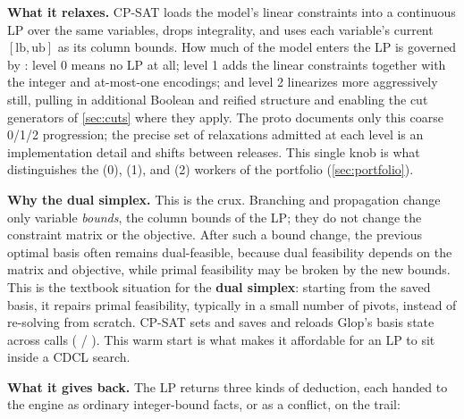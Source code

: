 \textbf{What it relaxes.} CP-SAT loads the model's linear constraints into a
continuous LP over the same variables, drops integrality, and uses each
variable's current $[\text{lb}, \text{ub}]$ as its column bounds. How much of the
model enters the LP is governed by : level 0 means no
LP at all; level 1 adds the linear constraints together with the integer and
at-most-one encodings; and level 2 linearizes more aggressively still, pulling in
additional Boolean and reified structure and enabling the cut generators of
\cref{sec:cuts} where they apply. The proto documents only this coarse
0/1/2 progression; the precise set of relaxations admitted at each level is an
implementation detail and shifts between releases. This single knob is what
distinguishes the  (0),  (1), and 
(2) workers of the portfolio (\cref{sec:portfolio}).

\textbf{Why the dual simplex.} This is the crux. Branching and propagation change
only variable \emph{bounds}, the column bounds of the LP; they do not change the
constraint matrix or the objective. After such a bound change, the previous
optimal basis often remains dual-feasible, because dual feasibility depends on
the matrix and objective, while primal feasibility may be broken by the new
bounds. This is the textbook situation for the \textbf{dual simplex}: starting
from the saved basis, it repairs primal feasibility, typically in a small number
of pivots, instead of re-solving from scratch. CP-SAT sets
 and saves and reloads Glop's basis state across
calls ( / ). This warm start is what
makes it affordable for an LP to sit inside a CDCL search.

\textbf{What it gives back.} The LP returns three kinds of deduction, each handed
to the engine as ordinary integer-bound facts, or as a conflict, on the trail:

